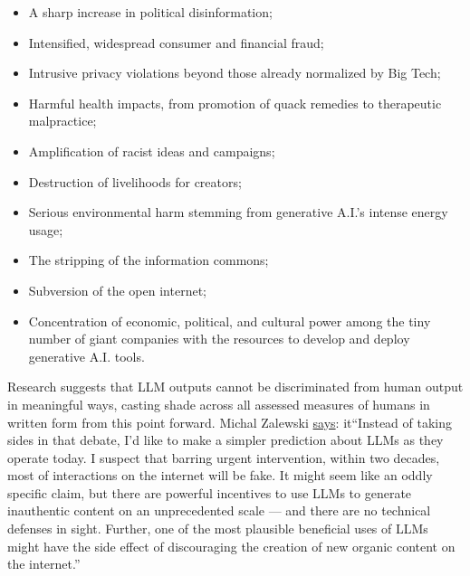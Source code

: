 \begin{itemize}
\item A sharp increase in political disinformation;
\item Intensified, widespread consumer and financial fraud;
\item Intrusive privacy violations beyond those already normalized by Big Tech;
\item Harmful health impacts, from promotion of quack remedies to therapeutic malpractice;
\item Amplification of racist ideas and campaigns;
\item Destruction of livelihoods for creators;
\item Serious environmental harm stemming from generative A.I.’s intense energy usage;
\item The stripping of the information commons;
\item Subversion of the open internet;
\item Concentration of economic, political, and cultural power among the tiny number of giant companies with the resources to develop and deploy generative A.I. tools.
\end{itemize}

Research suggests that LLM outputs cannot be discriminated from human output in meaningful ways, casting shade across all assessed measures of humans in written form \cite{sadasivan2023can} from this point forward. Michal Zalewski \href{https://lcamtuf.substack.com/p/llms-a-bleak-future-ahead}{says}: it{``Instead of taking sides in that debate, I’d like to make a simpler prediction about LLMs as they operate today. I suspect that barring urgent intervention, within two decades, most of interactions on the internet will be fake. It might seem like an oddly specific claim, but there are powerful incentives to use LLMs to generate inauthentic content on an unprecedented scale — and there are no technical defenses in sight. Further, one of the most plausible beneficial uses of LLMs might have the side effect of discouraging the creation of new organic content on the internet.''}

